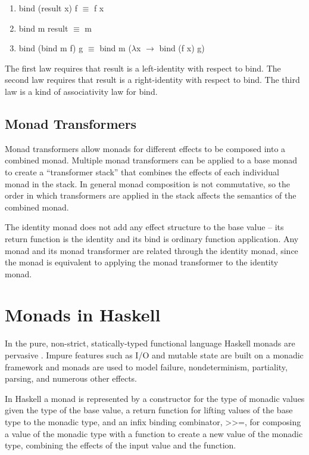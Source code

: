 \documentclass[natbib,10pt]{sigplanconf}
\begin{document}
\begin{enumerate}
\item {\mono bind (result x) f $\equiv$ f x}
\item {\mono bind m result $\equiv$ m}
\item {\mono bind (bind m f) g $\equiv$ bind m ($\lambda$x $\rightarrow$ bind (f x) g)}
\end{enumerate}

The first law requires that {\mono result} is a left-identity with
respect to {\mono bind}. The second law requires that {\mono result} is a
right-identity with respect to {\mono bind}. The third law is a kind of
associativity law for {\mono bind}.

\subsection{Monad Transformers}

Monad transformers allow monads for different effects to be composed
into a combined monad.  Multiple monad transformers can be applied to
a base monad to create a ``transformer stack'' that combines the
effects of each individual monad in the stack.  In general monad
composition is not commutative, so the order in which transformers are
applied in the stack affects the semantics of the combined monad.

The identity monad does not add any effect structure to the base value
-- its {\mono return} function is the identity and its {\mono bind} is
ordinary function application.  Any monad and its monad transformer
are related through the identity monad, since the monad is equivalent
to applying the monad transformer to the identity monad.

\section{Monads in Haskell}

\def \hbind {\mono >\mono >\mono =}

In the pure, non-strict, statically-typed functional language Haskell
monads are pervasive \citep{awkward-squad,haskell98}.  Impure features
such as I/O and mutable state are built on a monadic framework and
monads are used to model failure, nondeterminism, partiality, parsing,
and numerous other effects.

In Haskell a monad is represented by a constructor for the type of
monadic values given the type of the base value, a {\mono return}
function for lifting values of the base type to the monadic type, and
an infix binding combinator, \hbind, for composing a value of the
monadic type with a function to create a new value of the monadic
type, combining the effects of the input value and the function.
\end{document}
